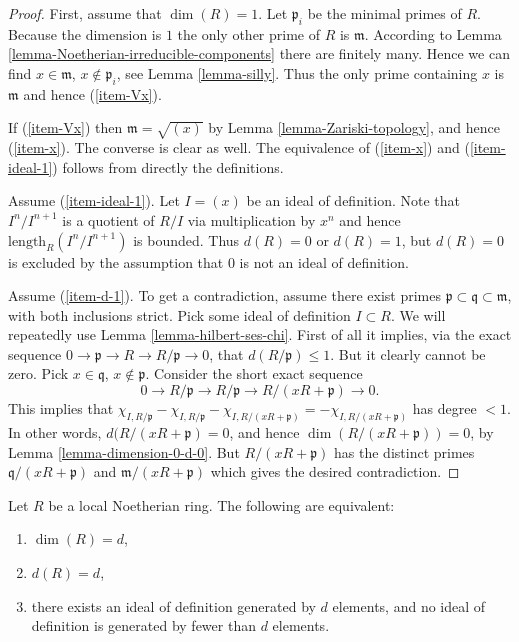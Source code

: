 \begin{proof}
First, assume that $\dim(R) = 1$.
Let $\mathfrak p_i$ be the minimal primes of $R$.
Because the dimension is $1$ the only other prime of $R$
is $\mathfrak m$.
According to Lemma \ref{lemma-Noetherian-irreducible-components}
there are finitely many. Hence we can find $x \in \mathfrak m$,
$x \not \in \mathfrak p_i$, see Lemma \ref{lemma-silly}.
Thus the only prime containing $x$ is $\mathfrak m$ and
hence (\ref{item-Vx}).

\medskip\noindent
If (\ref{item-Vx}) then $\mathfrak m = \sqrt{(x)}$ by
Lemma \ref{lemma-Zariski-topology}, and hence (\ref{item-x}).
The converse is clear as well.
The equivalence of (\ref{item-x}) and (\ref{item-ideal-1}) follows
from directly the definitions.

\medskip\noindent
Assume (\ref{item-ideal-1}).
Let $I = (x)$ be an ideal of definition.
Note that $I^n/I^{n + 1}$ is a quotient of $R/I$ via multiplication
by $x^n$ and hence $\text{length}_R(I^n/I^{n + 1})$ is bounded.
Thus $d(R) = 0$ or $d(R) = 1$, but $d(R) = 0$ is excluded
by the assumption that $0$ is not an ideal of definition.

\medskip\noindent
Assume (\ref{item-d-1}). To get a contradiction, assume there
exist primes $\mathfrak p \subset \mathfrak q \subset \mathfrak m$,
with both inclusions strict. Pick some ideal of definition $I \subset R$.
We will repeatedly use
Lemma \ref{lemma-hilbert-ses-chi}. First of all
it implies, via the exact sequence
$0 \to \mathfrak p \to R \to R/\mathfrak p \to 0$,
that $d(R/\mathfrak p) \leq 1$. But it clearly cannot
be zero. Pick $x\in \mathfrak q$, $x\not \in \mathfrak p$.
Consider the short exact sequence
$$
0 \to R/\mathfrak p \to R/\mathfrak p \to R/(xR + \mathfrak p) \to 0.
$$
This implies that $\chi_{I, R/\mathfrak p} - \chi_{I, R/\mathfrak p}
- \chi_{I, R/(xR + \mathfrak p)} = - \chi_{I, R/(xR + \mathfrak p)}$
has degree $ < 1$. In other words, $d(R/(xR + \mathfrak p) = 0$,
and hence $\dim(R/(xR + \mathfrak p)) = 0$, by
Lemma \ref{lemma-dimension-0-d-0}. But $R/(xR + \mathfrak p)$
has the distinct primes $\mathfrak q/(xR + \mathfrak p)$ and
$\mathfrak m/(xR + \mathfrak p)$ which gives the desired contradiction.
\end{proof}

\begin{proposition}
\label{proposition-dimension}
Let $R$ be a local Noetherian ring.
The following are equivalent:
\begin{enumerate}
\item $\dim(R) = d$,
\label{item-dim-d}
\item $d(R) = d$,
\label{item-d-d}
\item there exists an ideal of definition generated by $d$ elements,
and no ideal of definition is generated by fewer than $d$ elements.
\label{item-ideal-d}
\end{enumerate}
\end{proposition}

